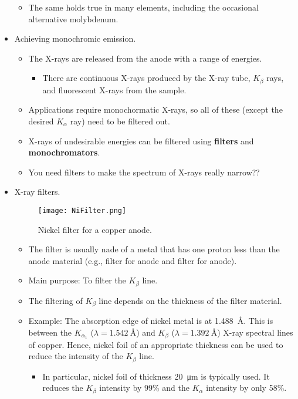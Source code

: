 \documentclass[../notes.tex]{subfiles}
\begin{document}
\begin{itemize}
\begin{itemize}
        \item The same holds true in many elements, including the occasional alternative molybdenum.
    \end{itemize}
    \item Achieving monochromic emission.
    \begin{itemize}
        \item The X-rays are released from the anode with a range of energies.
        \begin{itemize}
            \item There are continuous X-rays produced by the X-ray tube, $K_\beta$ rays, and fluorescent X-rays from the sample.
        \end{itemize}
        \item Applications require monochormatic X-rays, so all of these (except the desired $K_\alpha$ ray) need to be filtered out.
        \item X-rays of undesirable energies can be filtered using \textbf{filters} and \textbf{monochromators}.
        \item You need filters to make the spectrum of X-rays really narrow??
    \end{itemize}
    \item X-ray filters.
    \begin{figure}[h!]
        \centering
        \texttt{[image: NiFilter.png]}
        \caption{Nickel filter for a copper anode.}
        \label{fig:NiFilter}
    \end{figure}
    \begin{itemize}
        \item The filter is usually nade of a metal that has one proton less than the anode material (e.g.,  filter for  anode and  filter for  anode).
        \item Main purpose: To filter the $K_\beta$ line.
        \item The filtering of $K_\beta$ line depends on the thickness of the filter material.
        \item Example: The absorption edge of nickel metal is at \SI{1.488}{\angstrom}. This is between the $K_{\alpha_1}$ ($\lambda=\SI{1.542}{\angstrom}$) and $K_\beta$ ($\lambda=\SI{1.392}{\angstrom}$) X-ray spectral lines of copper. Hence, nickel foil of an appropriate thickness can be used to reduce the intensity of the  $K_\beta$ line.
        \begin{itemize}
            \item In particular, nickel foil of thickness \SI{20}{\micro\meter} is typically used. It reduces the $K_\beta$ intensity by 99\% and the $K_\alpha$ intensity by only 58\%.

\end{itemize}
\end{itemize}
\end{itemize}
\end{document}
